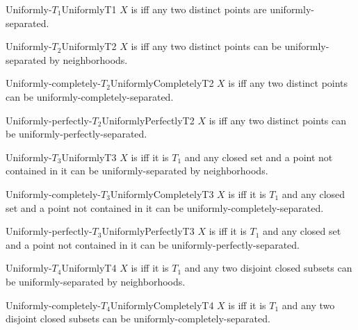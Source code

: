 \begin{dfn}{Uniformly-$T_1$}{UniformlyT1}
$X$ is  iff any two distinct points are uniformly-separated.
\end{dfn}
\begin{dfn}{Uniformly-$T_2$}{UniformlyT2}
$X$ is  iff any two distinct points can be uniformly-separated by neighborhoods.
\end{dfn}
\begin{dfn}{Uniformly-completely-$T_2$\hfill}{UniformlyCompletelyT2}
$X$ is  iff any two distinct points can be uniformly-completely-separated.
\end{dfn}
\begin{dfn}{Uniformly-perfectly-$T_2$\hfill}{UniformlyPerfectlyT2}
$X$ is  iff any two distinct points can be uniformly-perfectly-separated.
\end{dfn}
\begin{dfn}{Uniformly-$T_3$}{UniformlyT3}
$X$ is  iff it is $T_1$ and any closed set and a point not contained in it can be uniformly-separated by neighborhoods.
\end{dfn}
\begin{dfn}{Uniformly-completely-$T_3$\hfill}{UniformlyCompletelyT3}
$X$ is  iff it is $T_1$ and any closed set and a point not contained in it can be uniformly-completely-separated.
\end{dfn}
\begin{dfn}{Uniformly-perfectly-$T_3$\hfill}{UniformlyPerfectlyT3}
$X$ is  iff it is $T_1$ and any closed set and a point not contained in it can be uniformly-perfectly-separated.
\end{dfn}
\begin{dfn}{Uniformly-$T_4$}{UniformlyT4}
$X$ is  iff it is $T_1$ and any two disjoint closed subsets can be uniformly-separated by neighborhoods.
\end{dfn}
\begin{dfn}{Uniformly-completely-$T_4$\hfill}{UniformlyCompletelyT4}
$X$ is  iff it is $T_1$ and any two disjoint closed subsets can be uniformly-completely-separated.
\end{dfn}
